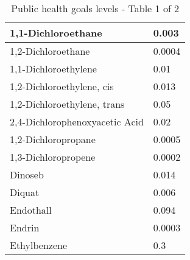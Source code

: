 \begin{table}[!htbp]
\begin{tabular}{|m{9cm}|m{5cm}|}
1,1-Dichloroethane                                                  & 0.003                                                   \\ \hline
1,2-Dichloroethane                                                  & 0.0004                                                  \\ \hline
1,1-Dichloroethylene                                                & 0.01                                                    \\ \hline
1,2-Dichloroethylene, cis                                           & 0.013                                                   \\ \hline
1,2-Dichloroethylene, trans                                         & 0.05                                                    \\ \hline
2,4-Dichlorophenoxyacetic Acid                                      & 0.02                                                    \\ \hline
1,2-Dichloropropane                                                 & 0.0005                                                  \\ \hline
1,3-Dichloropropene                                                 & 0.0002                                                  \\ \hline
Dinoseb                                                             & 0.014                                                   \\ \hline
Diquat                                                              & 0.006                                                   \\ \hline
Endothall                                                           & 0.094                                                   \\ \hline
Endrin                                                              & 0.0003                                                  \\ \hline
Ethylbenzene                                                        & 0.3                                                     \\ \hline
\end{tabular}
\caption{Public health goals levels - Table 1 of 2}
\label{table:PHG1}
\end{table}








